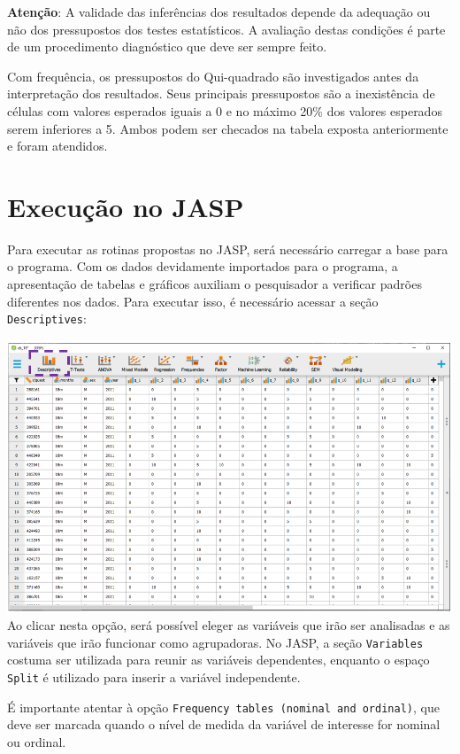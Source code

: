 \documentclass[
]{book}
\begin{document}
\textbf{Atenção}: A validade das inferências dos resultados depende da adequação ou não dos pressupostos dos testes estatísticos. A avaliação destas condições é parte de um procedimento diagnóstico que deve ser sempre feito.

Com frequência, os pressupostos do Qui-quadrado são investigados antes da interpretação dos resultados. Seus principais pressupostos são a inexistência de células com valores esperados iguais a 0 e no máximo 20\% dos valores esperados serem inferiores a 5. Ambos podem ser checados na tabela exposta anteriormente e foram atendidos.

\hypertarget{execuuxe7uxe3o-no-jasp-2}{%
\section{Execução no JASP}\label{execuuxe7uxe3o-no-jasp-2}}

Para executar as rotinas propostas no JASP, será necessário carregar a base para o programa. Com os dados devidamente importados para o programa, a apresentação de tabelas e gráficos auxiliam o pesquisador a verificar padrões diferentes nos dados. Para executar isso, é necessário acessar a seção \texttt{Descriptives}:

\includegraphics{./img/jasp_descriptives.png}
Ao clicar nesta opção, será possível eleger as variáveis que irão ser analisadas e as variáveis que irão funcionar como agrupadoras. No JASP, a seção \texttt{Variables} costuma ser utilizada para reunir as variáveis dependentes, enquanto o espaço \texttt{Split} é utilizado para inserir a variável independente.

É importante atentar à opção \texttt{Frequency\ tables\ (nominal\ and\ ordinal)}, que deve ser marcada quando o nível de medida da variável de interesse for nominal ou ordinal.
\end{document}
